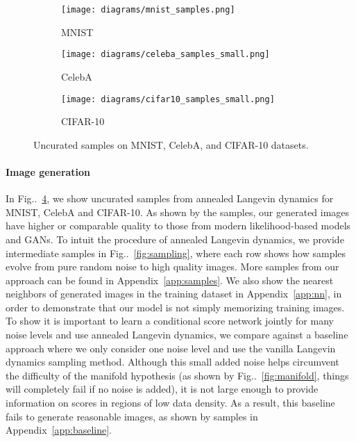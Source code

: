 \documentclass{article}
\makeatletter
\def\@onedot{\ifx\@let@token.\else.\null\fi\xspace}
\DeclareRobustCommand\onedot{\futurelet\@let@token\@onedot}
\newcommand{\figref}[1]{Fig\onedot~\ref{#1}}
\makeatother
\begin{document}
\begin{figure}\centering
    \begin{subfigure}[b]{0.3\textwidth}
        \texttt{[image: diagrams/mnist\_samples.png]}
        \caption{MNIST}
        \label{fig:mnist_samples}
    \end{subfigure}
    \begin{subfigure}[b]{0.3\textwidth}
        \texttt{[image: diagrams/celeba\_samples\_small.png]}
        \caption{CelebA}
        \label{fig:celeba_samples}
    \end{subfigure}
    \begin{subfigure}[b]{0.3\textwidth}
        \texttt{[image: diagrams/cifar10\_samples\_small.png]}
        \caption{CIFAR-10}
        \label{fig:cifar10_samples}
    \end{subfigure}
    \caption{Uncurated samples on MNIST, CelebA, and CIFAR-10 datasets.}
    \label{fig:samples}
\end{figure}

\paragraph{Image generation} In \figref{fig:samples}, we show uncurated samples from annealed Langevin dynamics for MNIST, CelebA and CIFAR-10. As shown by the samples, our generated images have higher or comparable quality to those from modern likelihood-based models and GANs. To intuit the procedure of annealed Langevin dynamics, we provide intermediate samples in \figref{fig:sampling}, where each row shows how samples evolve from pure random noise to high quality images. More samples from our approach can be found in Appendix~\ref{app:samples}. We also show the nearest neighbors of generated images in the training dataset in Appendix~\ref{app:nn}, in order to demonstrate that our model is not simply memorizing training images. To show it is important to learn a conditional score network jointly for many noise levels and use annealed Langevin dynamics, we compare against a baseline approach where we only consider one noise level  and use the vanilla Langevin dynamics sampling method. Although this small added noise helps circumvent the difficulty of the manifold hypothesis (as shown by \figref{fig:manifold}, things will completely fail if no noise is added), it is not large enough to provide information on scores in regions of low data density. As a result, this baseline fails to generate reasonable images, as shown by samples in Appendix~\ref{app:baseline}.
\end{document}

